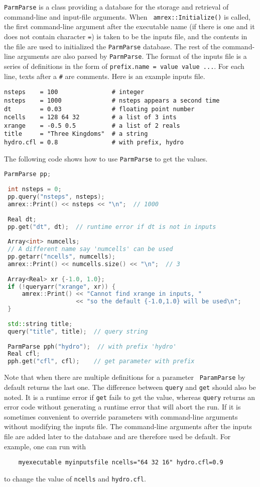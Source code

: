 {\tt ParmParse} is a class providing a database for the storage and
retrieval of command-line and input-file arguments.  When {\tt
  amrex::Initialize()} is called, the first command-line argument
after the executable name (if there is one and it does not contain
character {\tt =}) is taken to be the inputs file, and the contents in
the file are used to initialized the {\tt ParmParse} database.  The
rest of the command-line arguments are also parsed by {\tt ParmParse}.
The format of the inputs file is a series of definitions in the form
of {\tt prefix.name = value value ...}.  For each line, texts after a
{\tt \#} are comments.  Here is an example inputs file.
\begin{verbatim}
nsteps    = 100               # integer
nsteps    = 1000              # nsteps appears a second time
dt        = 0.03              # floating point number
ncells    = 128 64 32         # a list of 3 ints
xrange    = -0.5 0.5          # a list of 2 reals
title     = "Three Kingdoms"  # a string
hydro.cfl = 0.8               # with prefix, hydro 
\end{verbatim}
The following code shows how to use {\tt ParmParse} to get the values.
\begin{lstlisting}[language=cpp]
 ParmParse pp;
 
 int nsteps = 0;
 pp.query("nsteps", nsteps);
 amrex::Print() << nsteps << "\n";  // 1000
 
 Real dt;
 pp.get("dt", dt);  // runtime error if dt is not in inputs
 
 Array<int> numcells;
 // A different name say 'numcells' can be used
 pp.getarr("ncells", numcells);
 amrex::Print() << numcells.size() << "\n";  // 3
 
 Array<Real> xr {-1.0, 1.0};
 if (!queryarr("xrange", xr)) {
     amrex::Print() << "Cannot find xrange in inputs, "
                    << "so the default {-1.0,1.0} will be used\n";
 }
 
 std::string title;
 query("title", title);  // query string
 
 ParmParse pph("hydro");  // with prefix 'hydro'
 Real cfl;
 pph.get("cfl", cfl);    // get parameter with prefix
\end{lstlisting}
Note that when there are multiple definitions for a parameter {\tt
  ParamParse} by default returns the last one.  The difference between
{\tt query} and {\tt get} should also be noted.  It is a runtime error
if {\tt get} fails to get the value, whereas {\tt query} returns an
error code without generating a runtime error that will abort the run.
If it is sometimes convenient to override parameters with command-line
arguments without modifying the inputs file.  The command-line
arguments after the inputs file are added later to the database and
are therefore used be default.  For example, one can run with
\begin{verbatim}
    myexecutable myinputsfile ncells="64 32 16" hydro.cfl=0.9
\end{verbatim}
to change the value of {\tt ncells} and {\tt hydro.cfl}.

